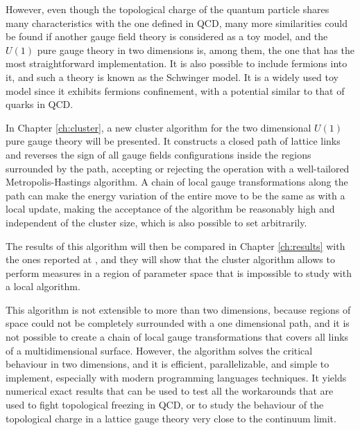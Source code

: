 However, even though the topological charge of the quantum particle shares many characteristics with the one defined in QCD,
many more similarities could be found if another gauge field theory is considered as a toy model,
and the $U(1)$ pure gauge theory in two dimensions is, among them, the one that has the most straightforward implementation.
It is also possible to include fermions into it,
and such a theory is known as the Schwinger model.
It is a widely used toy model since it exhibits fermions confinement,
with a potential similar to that of quarks in QCD.


In Chapter \ref{ch:cluster}, a new cluster algorithm for the two dimensional $U(1)$ pure gauge theory will be presented.
It constructs a closed path of lattice links and reverses the sign of all gauge fields configurations inside the regions surrounded by the path,
accepting or rejecting the operation with a well-tailored Metropolis-Hastings algorithm.
A chain of local gauge transformations along the path can make the energy variation of the entire move to be the same as with a local update,
making the acceptance of the algorithm be reasonably high and independent of the cluster size, which is also possible to set arbitrarily.

The results of this algorithm will then be compared in Chapter \ref{ch:results} with the ones reported at \cite{durr-hoelbling:2005}, and they will show that the cluster algorithm allows to perform measures in a region of parameter space that is impossible to study with a local algorithm.

This algorithm is not extensible to more than two dimensions,
because regions of space could not be completely surrounded with a one dimensional path,
and it is not possible to create a chain of local gauge transformations that covers all links of a multidimensional surface.
However, the algorithm solves the critical behaviour in two dimensions,
and it is efficient, parallelizable, and simple to implement, especially with modern programming languages techniques.
It yields numerical exact results that can be used to test all the workarounds that are used to fight topological freezing in QCD, or to study the behaviour of the topological charge in a lattice gauge theory very close to the continuum limit. 

